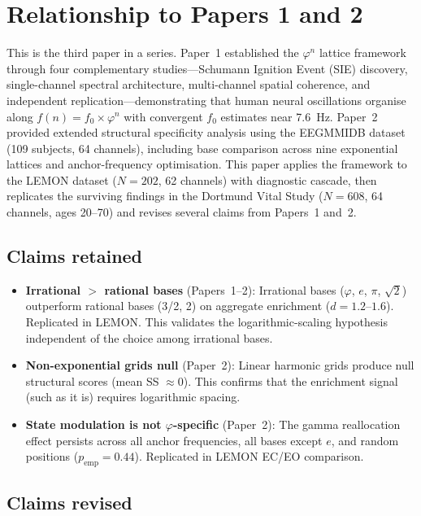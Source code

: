 \documentclass[11pt,a4paper]{article}
\newcommand{\phisym}{\varphi}
\newcommand{\fzero}{f_0}
\begin{document}
\clearpage
\appendix

\section{Relationship to Papers 1 and 2}
\label{app:papers12}

This is the third paper in a series. Paper~1 established the $\phisym^n$ lattice framework through four complementary studies---Schumann Ignition Event (SIE) discovery, single-channel spectral architecture, multi-channel spatial coherence, and independent replication---demonstrating that human neural oscillations organise along $f(n) = \fzero \times \phisym^n$ with convergent $\fzero$ estimates near 7.6~Hz. Paper~2 provided extended structural specificity analysis using the EEGMMIDB dataset (109 subjects, 64 channels), including base comparison across nine exponential lattices and anchor-frequency optimisation. This paper applies the framework to the LEMON dataset ($N = 202$, 62 channels) with diagnostic cascade, then replicates the surviving findings in the Dortmund Vital Study ($N = 608$, 64 channels, ages 20--70) and revises several claims from Papers~1 and~2.

\subsection{Claims retained}

\begin{itemize}
    \item \textbf{Irrational $>$ rational bases} (Papers~1--2): Irrational bases ($\phisym$, $e$, $\pi$, $\sqrt{2}$) outperform rational bases (3/2, 2) on aggregate enrichment ($d = 1.2$--$1.6$). Replicated in LEMON. This validates the logarithmic-scaling hypothesis independent of the choice among irrational bases.
    \item \textbf{Non-exponential grids null} (Paper~2): Linear harmonic grids produce null structural scores (mean SS $\approx 0$). This confirms that the enrichment signal (such as it is) requires logarithmic spacing.
    \item \textbf{State modulation is not $\phisym$-specific} (Paper~2): The gamma reallocation effect persists across all anchor frequencies, all bases except $e$, and random positions ($p_{\text{emp}} = 0.44$). Replicated in LEMON EC/EO comparison.
\end{itemize}

\subsection{Claims revised}
\end{document}
